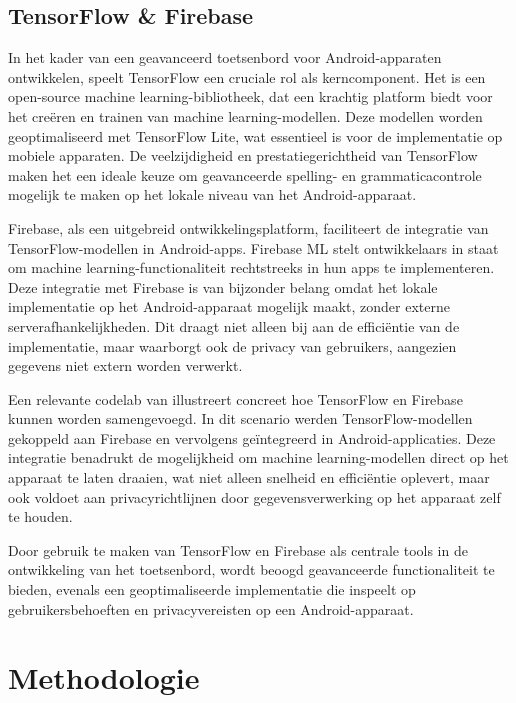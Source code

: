 \subsection{TensorFlow \& Firebase}

In het kader van een geavanceerd toetsenbord voor Android-apparaten ontwikkelen, speelt TensorFlow een cruciale rol als kerncomponent. Het is een open-source machine learning-bibliotheek, dat een krachtig platform biedt voor het creëren en trainen van machine learning-modellen. Deze modellen worden geoptimaliseerd met TensorFlow Lite, wat essentieel is voor de implementatie op mobiele apparaten. De veelzijdigheid en prestatiegerichtheid van TensorFlow maken het een ideale keuze om geavanceerde spelling- en grammaticacontrole mogelijk te maken op het lokale niveau van het Android-apparaat.

Firebase, als een uitgebreid ontwikkelingsplatform, faciliteert de integratie van TensorFlow-mo\-del\-len in Android-apps. Firebase ML stelt ontwikkelaars in staat om machine learning-func\-tio\-na\-li\-teit rechtstreeks in hun apps te implementeren. Deze integratie met Firebase is van bijzonder belang omdat het lokale implementatie op het Android-apparaat mogelijk maakt, zonder externe serverafhankelijkheden. Dit draagt niet alleen bij aan de efficiëntie van de implementatie, maar waarborgt ook de privacy van gebruikers, aangezien gegevens niet extern worden verwerkt.

Een relevante codelab van \textcite{ulukaya2023} illustreert concreet hoe TensorFlow en Firebase kunnen worden samengevoegd. In dit scenario werden TensorFlow-modellen gekoppeld aan Firebase en vervolgens geïntegreerd in Android-applicaties. Deze integratie benadrukt de mogelijkheid om machine learning-modellen direct op het apparaat te laten draaien, wat niet alleen snelheid en efficiëntie oplevert, maar ook voldoet aan privacyrichtlijnen door gegevensverwerking op het apparaat zelf te houden.

Door gebruik te maken van TensorFlow en Firebase als centrale tools in de ontwikkeling van het toetsenbord, wordt beoogd geavanceerde func\-tio\-na\-li\-teit te bieden, evenals een geoptimaliseerde implementatie die inspeelt op gebruikersbehoeften en privacyvereisten op een Android-apparaat.

\section{Methodologie}%
\label{sec:methodologie}

